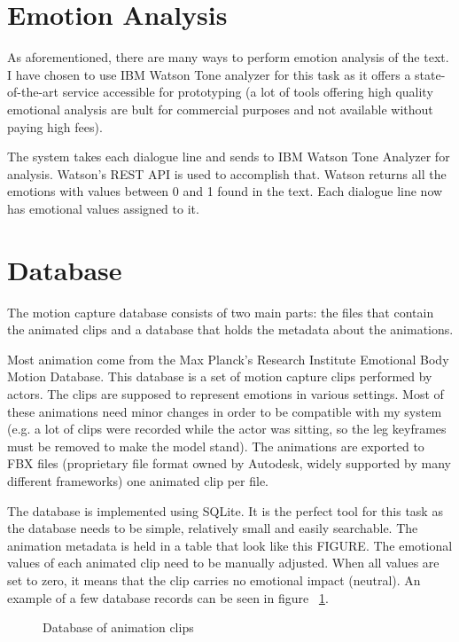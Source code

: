 \section{Emotion Analysis} 
\label{sec:emoanal}
As aforementioned, there are many ways to perform emotion analysis of the text. I have chosen to use IBM Watson Tone analyzer for this task as it offers a state-of-the-art service accessible for prototyping (a lot of tools offering high quality emotional analysis are bult for commercial purposes and not available without paying high fees).

The system takes each dialogue line and sends to IBM Watson Tone Analyzer for analysis. Watson's REST API is used to accomplish that. Watson returns all the emotions with values between 0 and 1 found in the text. Each dialogue line now has emotional values assigned to it.

\section{Database}

The motion capture database consists of two main parts: the files that contain the animated clips and a database that holds the metadata about the animations.

Most animation come from the Max Planck's Research Institute Emotional Body Motion Database. This database is a set of motion capture clips performed by actors. The clips are supposed to represent emotions in various settings. Most of these animations need minor changes in order to be compatible with my system (e.g. a lot of clips were recorded while the actor was sitting, so the leg keyframes must be removed to make the model stand). The animations are exported to FBX files (proprietary file format owned by Autodesk, widely supported by many different frameworks) one animated clip per file.

The database is implemented using SQLite. It is the perfect tool for this task as the database needs to be simple, relatively small and easily searchable. The animation metadata is held in a table that look like this FIGURE. The emotional values of each animated clip need to be manually adjusted. When all values are set to zero, it means that the clip carries no emotional impact (neutral). An example of a few database records can be seen in figure ~\ref{fig:db}.

\begin{figure}[!ht]
\centerline{}
\caption{Database of animation clips}\label{fig:db}
\end{figure}


